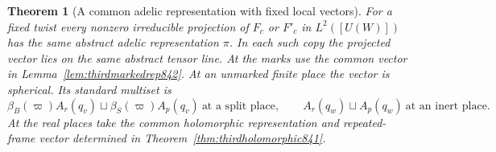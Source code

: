 \documentclass[a4paper,11pt]{article}
\newtheorem{theorem}[proposition]{Theorem}
\theoremstyle{definition}
\theoremstyle{remark}
\numberwithin{equation}{section}
\begin{document}
\begin{theorem}[A common adelic representation with fixed local vectors]
\leavevmode\label{thm:thirdadelic842}
For a fixed twist every nonzero irreducible projection of
\(F_c\) or \(F'_c\) in \(L^2([U(W)])\) has the same abstract
adelic representation \(\pi\). In each such copy the
projected vector lies on the same abstract tensor line.
At the marks use the common vector in
Lemma~\ref{lem:thirdmarkedrep842}. At an unmarked finite
place the vector is spherical. Its standard multiset is
\[
 \beta_B(\varpi)A_r(q_v)\sqcup\beta_S(\varpi)A_p(q_v)
       \ \text{at a split place},\qquad
 A_r(q_w)\sqcup A_p(q_w)
       \ \text{at an inert place}.
\]
At the real places take the common holomorphic representation
and repeated-frame vector determined in
Theorem~\ref{thm:thirdholomorphic841}.
\end{theorem}
\end{document}
